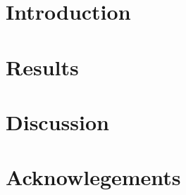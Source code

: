 \maketitle




\section{Introduction}




\section{Results}


\section{Discussion}


\section{Acknowlegements}





\onecolumngrid

% 


\pagebreak
\FloatBarrier


\beginsupplement
\setcounter{secnumdepth}{4}
